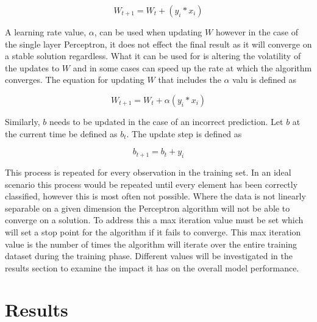 \documentclass[10pt,twocolumn,letterpaper]{article}
\begin{document}
\begin{equation}\label{eq:updateweight}
   W_{t+1} = W_t + (y_i * x_i)
\end{equation}

A learning rate value, $\alpha$, can be used when updating $W$ however in the case of the single layer
Perceptron, it does not effect the final result as it will converge on a stable solution regardless. What it
can be used for is altering the volatility of the updates to $W$ and in some cases can speed up the rate at
which the algorithm converges. The equation for updating $W$ that includes the $\alpha$ valu is defined as

\begin{equation}\label{eq:updateweight}
   W_{t+1} = W_t + \alpha (y_i * x_i)
\end{equation}

Similarly, $b$ needs to be updated in the case of an incorrect prediction. Let $b$ at the current time
be defined as $b_t$. The update step is defined as

\begin{equation}\label{eq:updatebias}
   b_{t+1} = b_t + y_i
\end{equation}

This process is repeated for every observation in the training set. In an ideal scenario this process would
be repeated until every element has been correctly classified, however this is most often not possible. Where
the data is not linearly separable on a given dimension the Perceptron algorithm will not be able to converge
on a solution. To address this a max iteration value must be set which will set a stop point for the algorithm
if it fails to converge. This max iteration value is the number of times the algorithm will iterate over the
entire training dataset during the training phase. Different values will be investigated in the results section
to examine the impact it has on the overall model performance.

\section {Results}
\end{document}
